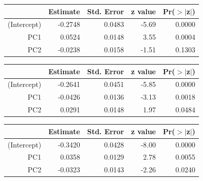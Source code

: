 \documentclass[a4paper,12pt]{Latex/Classes/PhDthesisPSnPDF}
\begin{document}
\newpage

\begin{center}
\begin{table}[ht]
\centering
\begin{tabular}{rrrrr}
  \hline
 & Estimate & Std. Error & z value & Pr($>$$|$z$|$) \\ 
  \hline
(Intercept) & -0.2748 & 0.0483 & -5.69 & 0.0000 \\ 
  PC1 & 0.0524 & 0.0148 & 3.55 & 0.0004 \\ 
  PC2 & -0.0238 & 0.0158 & -1.51 & 0.1303 \\ 
   \hline
\end{tabular}
\end{table}\end{center}

\begin{center}
\begin{table}[ht]
\centering
\begin{tabular}{rrrrr}
  \hline
 & Estimate & Std. Error & z value & Pr($>$$|$z$|$) \\ 
  \hline
(Intercept) & -0.2641 & 0.0451 & -5.85 & 0.0000 \\ 
  PC1 & -0.0426 & 0.0136 & -3.13 & 0.0018 \\ 
  PC2 & 0.0291 & 0.0148 & 1.97 & 0.0484 \\ 
   \hline
\end{tabular}
\end{table}\end{center}
\begin{center}
\begin{table}[ht]
\centering
\begin{tabular}{rrrrr}
  \hline
 & Estimate & Std. Error & z value & Pr($>$$|$z$|$) \\ 
  \hline
(Intercept) & -0.3420 & 0.0428 & -8.00 & 0.0000 \\ 
  PC1 & 0.0358 & 0.0129 & 2.78 & 0.0055 \\ 
  PC2 & -0.0323 & 0.0143 & -2.26 & 0.0240 \\ 
   \hline
\end{tabular}
\end{table}\end{center}
\end{document}
